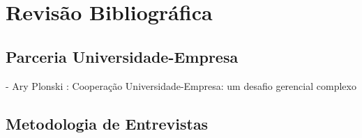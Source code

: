 \chapter[Revisão Bibliográfica]{Revisão Bibliográfica}
\label{chap:revisao}

\section{Parceria Universidade-Empresa}
\label{cha:ensino}

- Ary Plonski : Cooperação Universidade-Empresa: um desafio gerencial complexo

\section{Metodologia de Entrevistas}
\label{cha:ensino}
